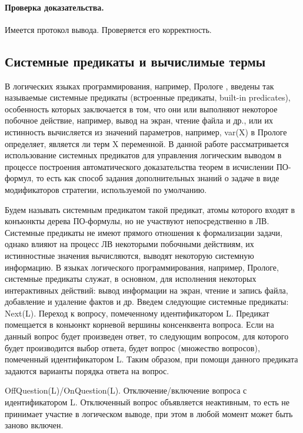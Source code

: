 \paragraph{Проверка доказательства.} Имеется протокол вывода. Проверяется его корректность.

\subsection{Системные предикаты и вычислимые термы}
В логических языках программирования, например, Прологе \cite{Bratko}, введены так называемые системные предикаты (встроенные предикаты, built-in predicates), особенность которых заключается в том, что они или выполняют некоторое побочное действие, например, вывод на экран, чтение файла и др., или их истинность вычисляется из значений параметров, например, var(X) в Прологе определяет, является ли терм X переменной. 
В данной работе рассматривается использование системных предикатов для управления логическим выводом в процессе построения автоматического доказательства теорем в исчислении ПО-формул, то есть как способ задания дополнительных знаний о задаче в виде модификаторов стратегии, используемой по умолчанию.

Будем называть системным предикатом такой предикат, атомы которого входят в конъюнкты дерева ПО-формулы, но не участвуют непосредственно в ЛВ. Системные предикаты не имеют прямого отношения к формализации задачи, однако влияют на процесс ЛВ некоторыми побочными действиям, их истинностные значения вычисляются, выводят некоторую системную информацию. В языках логического программирования, например, Прологе, системные предикаты служат, в основном, для исполнения некоторых интерактивных действий: вывод информации на экран, чтение и запись файла, добавление и удаление фактов и др. 
Введем следующие системные предикаты:
Next(L). Переход к вопросу, помеченному идентификатором L. Предикат помещается в коньюнкт корневой вершины консенквента вопроса.  Если на данный вопрос будет произведен ответ, то следующим вопросом, для которого будет производится выбор ответа, будет вопрос (множество вопросов), помеченный идентификатором L. Таким образом, при помощи данного предиката задаются варианты порядка ответа на вопрос.

OffQuestion(L)/OnQuestion(L). Отключение/включение вопроса с идентификатором L. Отключенный вопрос объявляется неактивным, то есть не принимает участие в логическом выводе, при этом в любой момент может быть заново включен.

